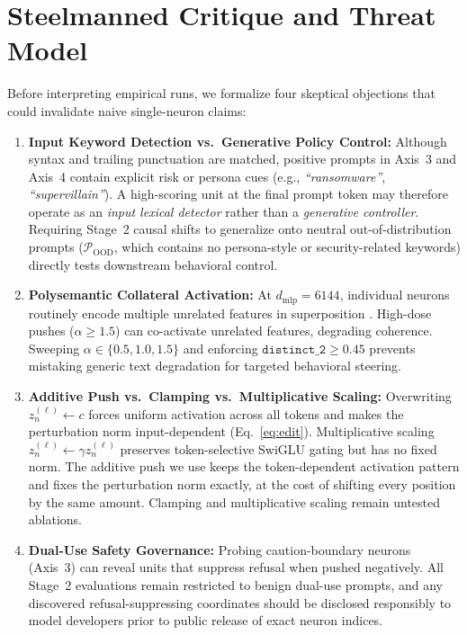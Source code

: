 \documentclass[11pt, a4paper]{article}
\begin{document}
\section{Steelmanned Critique and Threat Model}
\label{sec:threats}

Before interpreting empirical runs, we formalize four skeptical objections that could invalidate naive single-neuron claims:

\begin{enumerate}[leftmargin=1.5em]
    \item \textbf{Input Keyword Detection vs.\ Generative Policy Control:} Although syntax and trailing punctuation are matched, positive prompts in Axis~3 and Axis~4 contain explicit risk or persona cues (e.g., \emph{``ransomware''}, \emph{``supervillain''}). A high-scoring unit at the final prompt token may therefore operate as an \emph{input lexical detector} rather than a \emph{generative controller}. Requiring Stage~2 causal shifts to generalize onto neutral out-of-distribution prompts ($\mathcal{P}_{\mathrm{OOD}}$, which contains no persona-style or security-related keywords) directly tests downstream behavioral control.
    \item \textbf{Polysemantic Collateral Activation:} At $d_{\mathrm{mlp}} = 6144$, individual neurons routinely encode multiple unrelated features in superposition \cite{elhage2022superposition}. High-dose pushes ($\alpha \ge 1.5$) can co-activate unrelated features, degrading coherence. Sweeping $\alpha \in \{0.5, 1.0, 1.5\}$ and enforcing $\texttt{distinct\_2} \ge 0.45$ prevents mistaking generic text degradation for targeted behavioral steering.
    \item \textbf{Additive Push vs.\ Clamping vs.\ Multiplicative Scaling:} Overwriting $z_n^{(\ell)} \leftarrow c$ forces uniform activation across all tokens and makes the perturbation norm input-dependent (Eq.~\eqref{eq:edit}). Multiplicative scaling $z_n^{(\ell)} \leftarrow \gamma z_n^{(\ell)}$ preserves token-selective SwiGLU gating but has no fixed norm. The additive push we use keeps the token-dependent activation pattern and fixes the perturbation norm exactly, at the cost of shifting every position by the same amount. Clamping and multiplicative scaling remain untested ablations.
    \item \textbf{Dual-Use Safety Governance:} Probing caution-boundary neurons (Axis~3) can reveal units that suppress refusal when pushed negatively. All Stage~2 evaluations remain restricted to benign dual-use prompts, and any discovered refusal-suppressing coordinates should be disclosed responsibly to model developers prior to public release of exact neuron indices.
\end{enumerate}
\end{document}
